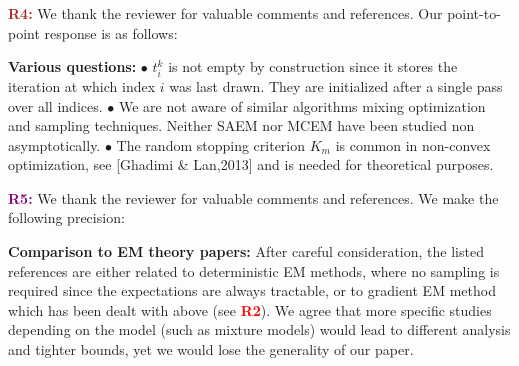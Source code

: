 \documentclass{article}
\begin{document}
\textbf{\textcolor{brown}{R4:}} We thank the reviewer for valuable comments and references. Our point-to-point response is as follows:\vspace{-0.05in}

\textbf{Various questions:} $\bullet$ $t_i^k$ is not empty by construction since it stores the iteration at which index $i$ was last drawn. 
They are initialized after a single pass over all indices.
$\bullet$ We are not aware of similar algorithms mixing optimization and sampling techniques. 
Neither SAEM nor MCEM have been studied non asymptotically.
$\bullet$ The random stopping criterion $K_m$ is common in non-convex optimization, see [Ghadimi \& Lan,2013] and is needed for theoretical purposes.\vspace{-0.05in}


\textbf{\textcolor{purple}{R5:}} We thank the reviewer for valuable comments and references. We make the following precision:\vspace{-0.05in}

\textbf{Comparison to EM theory papers:}
After careful consideration, the listed references are either related to deterministic EM methods, where no sampling is required since the expectations are always tractable, or to gradient EM method which has been dealt with above (see \textbf{\textcolor{red}{R2}}).
We agree that more specific studies depending on the model (such as mixture models) would lead to different analysis and tighter bounds, yet we would lose the generality of our paper.
\end{document}

